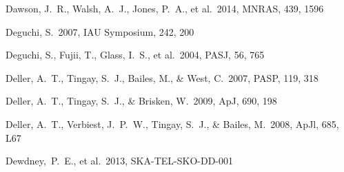 \begin{thebibliography}{99}
\begin{multicols}{2}
{
Dawson, J.~R., Walsh, A.~J., Jones, P.~A., et al.\ 2014, MNRAS, 439, 1596 

 Deguchi, S.\ 2007, IAU Symposium, 242, 200 

 Deguchi, S., Fujii, T., Glass, I.~S., et al.\ 2004, PASJ, 56, 765 









 Deller, A.~T., Tingay, S.~J., Bailes, M., \& West, C.\ 2007, PASP, 119, 318 

 Deller, A.~T., Tingay, S.~J., \& Brisken, W.\ 2009, ApJ, 690, 198 

 Deller, A.~T., Verbiest, J.~P.~W., Tingay, S.~J., \& Bailes, M.\ 2008, ApJl, 685, L67 

 Dewdney,~P.~E., et al.\ 2013, SKA-TEL-SKO-DD-001

}
\end{multicols}
\end{thebibliography}
